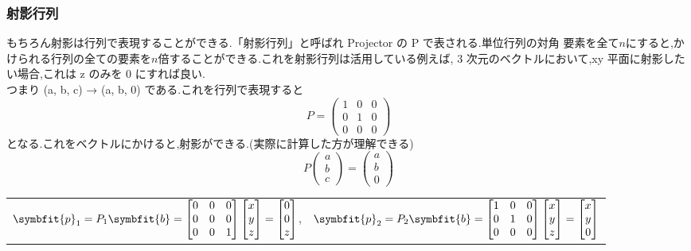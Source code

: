 \subsubsection{射影行列}
もちろん射影は行列で表現することができる.「射影行列」と呼ばれ Projector の P で表される.単位行列の対角
要素を全て$n$にすると,かけられる行列の全ての要素を$n$倍することができる.これを射影行列は活用している例えば,
3 次元のベクトルにおいて,xy 平面に射影したい場合,これは z のみを 0 にすれば良い.\\つまり (a, b, c) → (a, b, 0)
である.これを行列で表現すると
\[
P=\begin{pmatrix}
    1 & 0 & 0 \\ 0 & 1 & 0 \\ 0 & 0 & 0
\end{pmatrix}
\]
となる.これをベクトルにかけると,射影ができる.(実際に計算した方が理解できる)
\[
P
\begin{pmatrix}
    a \\ b \\ c
\end{pmatrix}=
\begin{pmatrix}
    a \\ b \\ 0
\end{pmatrix}\]
\begin{tabularx}{\linewidth}{XX}
    \hspace{1cm}$\symbfit{p}_1=P_1\symbfit{b}=
    \begin{bmatrix}
        0 & 0 & 0 \\ 0 & 0 & 0 \\ 0 & 0 & 1
    \end{bmatrix}
    \begin{bmatrix}
        x \\ y \\ z
    \end{bmatrix}=
    \begin{bmatrix}
        0 \\ 0 \\ z
    \end{bmatrix}$, 
    & 
    $\symbfit{p}_2=P_2\symbfit{b}=
    \begin{bmatrix}
        1 & 0 & 0 \\ 0 & 1 & 0 \\ 0 & 0 & 0
    \end{bmatrix}
    \begin{bmatrix}
        x \\ y \\ z
    \end{bmatrix}=
    \begin{bmatrix}
        x \\ y \\ 0
    \end{bmatrix}$ 
\end{tabularx}
